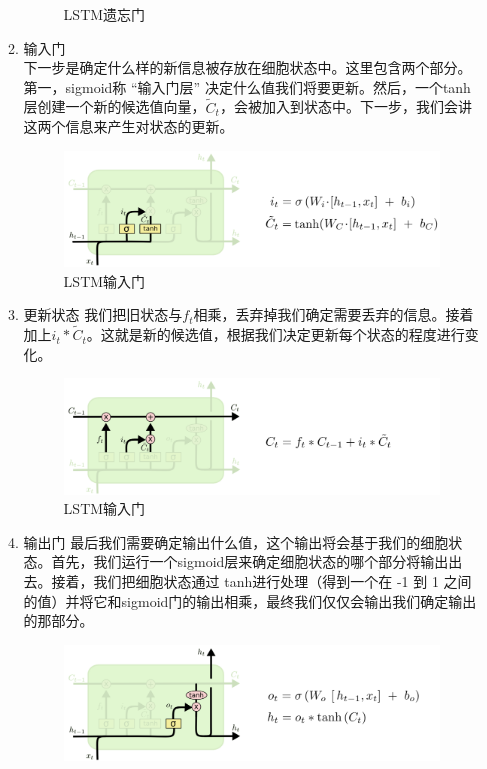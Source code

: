 \begin{enumerate}
\begin{enumerate}
\begin{figure}[h]
			\caption{LSTM遗忘门}
		\end{figure}
		\item 输入门\\
		下一步是确定什么样的新信息被存放在细胞状态中。这里包含两个部分。第一，sigmoid称 “输入门层” 决定什么值我们将要更新。然后，一个tanh层创建一个新的候选值向量，$\tilde{C}_t$，会被加入到状态中。下一步，我们会讲这两个信息来产生对状态的更新。
		\begin{figure}[h]
			\centering
			\includegraphics[width=1\textwidth]{./Tex_files/lstminput.png}
			\caption{LSTM输入门}
		\end{figure}
		\item 更新状态
		我们把旧状态与$f_t$相乘，丢弃掉我们确定需要丢弃的信息。接着加上$i_t * \tilde{C}_t$。这就是新的候选值，根据我们决定更新每个状态的程度进行变化。
		\begin{figure}[h]
			\centering
			\includegraphics[width=1\textwidth]{./Tex_files/lstmcell.png}
			\caption{LSTM输入门}
		\end{figure}
		\item 输出门
		最后我们需要确定输出什么值，这个输出将会基于我们的细胞状态。首先，我们运行一个sigmoid层来确定细胞状态的哪个部分将输出出去。接着，我们把细胞状态通过 tanh进行处理（得到一个在 -1 到 1 之间的值）并将它和sigmoid门的输出相乘，最终我们仅仅会输出我们确定输出的那部分。
		\begin{figure}[h]
			\centering
			\includegraphics[width=1\textwidth]{./Tex_files/lstmoutput.png}

\end{figure}
\end{enumerate}
\end{enumerate}

